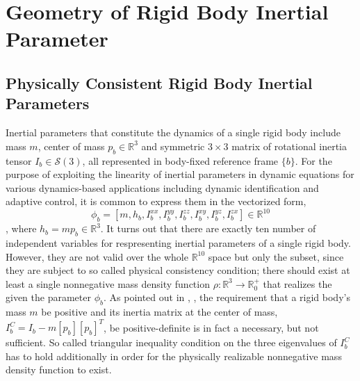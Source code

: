 \documentclass[letterpaper, 10 pt, conference]{ieeeconf}  %
\begin{document}
\section{Geometry of Rigid Body Inertial Parameter}
\subsection{Physically Consistent Rigid Body Inertial Parameters}
Inertial parameters that constitute the dynamics of a single rigid body include mass $m$, center of mass $p_{b}\in\mathbb{R}^{3}$ and symmetric $3\times 3$ matrix of rotational inertia tensor $I_{b}\in\mathcal{S}(3)$, all represented in body-fixed reference frame $\{b\}$. For the purpose of exploiting the linearity of inertial parameters in dynamic equations for various dynamics-based applications including dynamic identification and adaptive control, it is common to express them in the vectorized form,
\begin{equation*}
\phi_{b} = [m,h_{b},I_{b}^{xx},I_{b}^{yy},I_{b}^{zz},I_{b}^{xy},I_{b}^{yz},I_{b}^{zx}]\in\mathbb{R}^{10}
\end{equation*}
, where $h_{b} = mp_{b}\in \mathbb{R}^{3}$. It turns out that there are exactly ten number of independent variables for respresenting inertial parameters of a single rigid body. However, they are not valid over the whole $\mathbb{R}^{10}$ space but only the subset, since they are subject to so called physical consistency condition; there should exist at least a single nonnegative mass density function $\rho : \mathbb{R}^{3} \rightarrow \mathbb{R}^{+}_{0}$ that realizes the given the parameter $\phi_{b}$. As pointed out in \cite{Wittenberg_Dynamics}, \cite{Traversaro_IROS}, the requirement that a rigid body's mass $m$ be positive
and its inertia matrix at the center of mass, $I_{b}^{C}=I_{b}-m[p_{b}][p_{b}]^{T}$, be positive-definite is in fact a necessary, but not sufficient. So called triangular inequality condition on the three eigenvalues of $I_{b}^{C}$ has to hold additionally in order for the physically realizable nonnegative mass density function to exist. 
\end{document}
